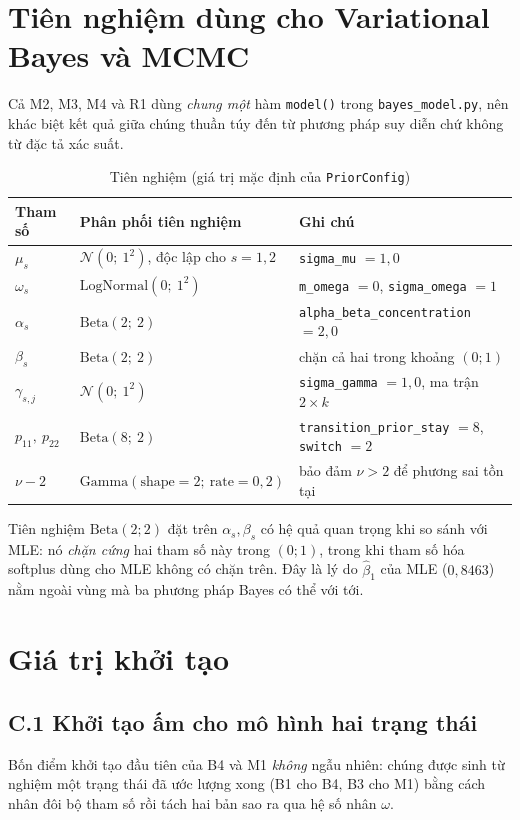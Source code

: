 \documentclass[11pt,a4paper]{article}
\begin{document}
\section{Tiên nghiệm dùng cho Variational Bayes và MCMC}

Cả M2, M3, M4 và R1 dùng \emph{chung một} hàm \texttt{model()} trong
\texttt{bayes\_model.py}, nên khác biệt kết quả giữa chúng thuần túy đến từ
phương pháp suy diễn chứ không từ đặc tả xác suất.

\begin{table}[H]\centering\footnotesize
\caption{Tiên nghiệm (giá trị mặc định của \texttt{PriorConfig})}
\begin{tabularx}{\textwidth}{l l X}
\toprule
\textbf{Tham số} & \textbf{Phân phối tiên nghiệm} & \textbf{Ghi chú} \\
\midrule
$\mu_s$ & $\mathcal{N}(0;\ 1^2)$, độc lập cho $s=1,2$ & \texttt{sigma\_mu} $=1{,}0$ \\
$\omega_s$ & $\mathrm{LogNormal}(0;\ 1^2)$ & \texttt{m\_omega} $=0$, \texttt{sigma\_omega} $=1$ \\
$\alpha_s$ & $\mathrm{Beta}(2;\ 2)$ & \texttt{alpha\_beta\_concentration} $=2{,}0$ \\
$\beta_s$ & $\mathrm{Beta}(2;\ 2)$ & chặn cả hai trong khoảng $(0;1)$ \\
$\gamma_{s,j}$ & $\mathcal{N}(0;\ 1^2)$ & \texttt{sigma\_gamma} $=1{,}0$, ma trận $2\times k$ \\
$p_{11},\ p_{22}$ & $\mathrm{Beta}(8;\ 2)$ & \texttt{transition\_prior\_stay} $=8$, \texttt{switch} $=2$ \\
$\nu-2$ & $\mathrm{Gamma}(\text{shape}=2;\ \text{rate}=0{,}2)$ & bảo đảm $\nu>2$ để phương sai tồn tại \\
\bottomrule
\end{tabularx}
\end{table}

Tiên nghiệm $\mathrm{Beta}(2;2)$ đặt trên $\alpha_s,\beta_s$ có hệ quả quan trọng khi
so sánh với MLE: nó \emph{chặn cứng} hai tham số này trong $(0;1)$, trong khi tham số
hóa softplus dùng cho MLE không có chặn trên. Đây là lý do $\hat\beta_1$ của MLE
($0{,}8463$) nằm ngoài vùng mà ba phương pháp Bayes có thể với tới.

\section{Giá trị khởi tạo}

\subsection*{C.1 Khởi tạo ấm cho mô hình hai trạng thái}
Bốn điểm khởi tạo đầu tiên của B4 và M1 \emph{không} ngẫu nhiên: chúng được sinh
từ nghiệm một trạng thái đã ước lượng xong (B1 cho B4, B3 cho M1) bằng cách nhân đôi
bộ tham số rồi tách hai bản sao ra qua hệ số nhân $\omega$.
\end{document}
